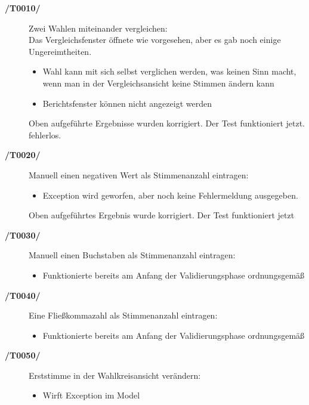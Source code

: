 \documentclass[12pt,a4paper,titlepage]{article}
\begin{document}
\begin{description}
	\item[\textbf{/T0010/}] Zwei Wahlen miteinander vergleichen: \\
	Das Vergleichsfenster öffnete wie vorgesehen, aber es gab noch einige Ungereimtheiten.
	
	\begin{itemize}
	\item Wahl kann mit sich selbst verglichen werden, was keinen Sinn macht, wenn man in der Vergleichsansicht keine Stimmen ändern kann
	\item Berichtsfenster können nicht angezeigt werden
	\end{itemize}
	
	Oben aufgeführte Ergebnisse wurden korrigiert. Der Test funktioniert jetzt. fehlerlos.
	\item[\textbf{/T0020/}] Manuell einen negativen Wert als Stimmenanzahl eintragen: \\
	
	\begin{itemize}
	\item Exception wird geworfen, aber noch keine Fehlermeldung ausgegeben.
	\end{itemize}
	
	Oben aufgeführtes Ergebnis wurde korrigiert. Der Test funktioniert jetzt
	\item[\textbf{/T0030/}] Manuell einen Buchstaben als Stimmenanzahl eintragen: \\
	
	\begin{itemize}
	\item Funktionierte bereits am Anfang der Validierungsphase ordnungsgemäß
	\end{itemize}
	
	\item[\textbf{/T0040/}] Eine Fließkommazahl als Stimmenanzahl eintragen: \\
	\begin{itemize}
	\item Funktionierte bereits am Anfang der Validierungsphase ordnungsgemäß
	\end{itemize}
	
	\item[\textbf{/T0050/}] Erststimme in der Wahlkreisansicht verändern: \\
	\begin{itemize}
	\item Wirft Exception im Model
	\end{itemize}
	

\end{description}
\end{document}
